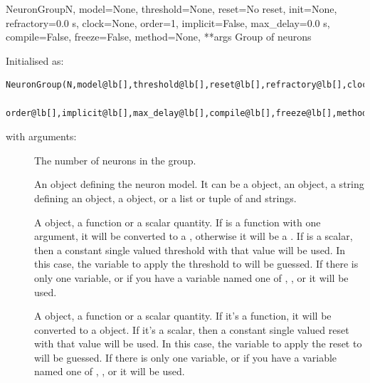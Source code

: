 \documentclass[letterpaper,10pt]{manual}
\begin{document}
\hypertarget{brian.NeuronGroup}{}\begin{classdesc}{NeuronGroup}{N, model=None, threshold=None, reset=No reset, init=None, refractory=0.0 s, clock=None, order=1, implicit=False, max\_delay=0.0 s, compile=False, freeze=False, method=None, **args}
Group of neurons

Initialised as:

\begin{Verbatim}[commandchars=@\[\]]
NeuronGroup(N,model@lb[],threshold@lb[],reset@lb[],refractory@lb[],clock@lb[],
        order@lb[],implicit@lb[],max_delay@lb[],compile@lb[],freeze@lb[],method@rb[]@rb[]@rb[]@rb[]@rb[]@rb[]@rb[]@rb[]@rb[]@rb[])
\end{Verbatim}

with arguments:
\begin{description}
\item[]
The number of neurons in the group.

\item[]
An object defining the neuron model. It can be a  object,
an \hyperlink{brian.Equations}{} object, a string defining an \hyperlink{brian.Equations}{} object,
a  object, or a list or tuple of \hyperlink{brian.Equations}{} and
strings.

\item[]
A \hyperlink{brian.Threshold}{} object, a function or a scalar quantity.
If  is a function with one argument, it will be
converted to a \hyperlink{brian.SimpleFunThreshold}{}, otherwise it will be a
\hyperlink{brian.FunThreshold}{}. If  is a scalar, then a constant
single valued threshold with that value will be used. In this case,
the variable to apply the threshold to will be guessed. If there is
only one variable, or if you have a variable named one of
, ,  or  it will be used.

\item[]
A \hyperlink{brian.Reset}{} object, a function or a scalar quantity. If it's a
function, it will be converted to a \hyperlink{brian.FunReset}{} object. If it's
a scalar, then a constant single valued reset with that value will
be used. In this case,
the variable to apply the reset to will be guessed. If there is
only one variable, or if you have a variable named one of
, ,  or  it will be used.


\end{description}
\end{classdesc}
\end{document}
